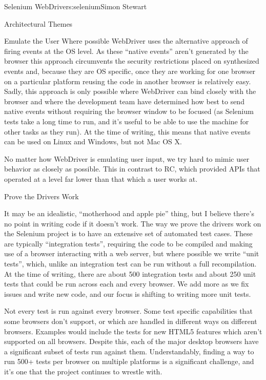 \begin{aosachapter}{Selenium WebDriver}{s:selenium}{Simon Stewart}
\begin{aosasect1}{Architectural Themes}
\begin{aosasect2}{Emulate the User}
Where possible WebDriver uses the alternative approach of firing
events at the OS level. As these ``native events'' aren't generated by
the browser this approach circumvents the security restrictions placed
on synthesized events and, because they are OS specific, once they are
working for one browser on a particular platform reusing the code in
another browser is relatively easy. Sadly, this approach is only
possible where WebDriver can bind closely with the browser
and where the development team have determined how best to send
native events without requiring the browser window to be focused
(as Selenium tests take a long time to run, and it's useful to be
able to use the machine for other tasks as they run). At the time
of writing, this means that native events can be used on Linux and
Windows, but not Mac OS X.

No matter how WebDriver is emulating user input, we try hard to mimic
user behavior as closely as possible. This in contrast to RC, which
provided APIs that operated at a level far lower than that which a
user works at.

\end{aosasect2}

\begin{aosasect2}{Prove the Drivers Work}

It may be an idealistic, ``motherhood and apple pie'' thing, but I
believe there's no point in writing code if it doesn't work. The way
we prove the drivers work on the Selenium project is to have an
extensive set of automated test cases. These are typically
``integration tests'', requiring the code to be compiled and making
use of a browser interacting with a web server, but where possible we
write ``unit tests'', which, unlike an integration test can be run
without a full recompilation. At the time of writing, there are about
500 integration tests and about 250 unit tests that could be run
across each and every browser. We add more as we fix issues and write
new code, and our focus is shifting to writing more unit tests.

Not every test is run against every browser. Some test specific
capabilities that some browsers don't support, or which are handled in
different ways on different browsers. Examples would include the tests
for new HTML5 features which aren't supported on all browsers. Despite
this, each of the major desktop browsers have a significant subset of
tests run against them. Understandably, finding a way to run 500+
tests per browser on multiple platforms is a significant challenge,
and it's one that the project continues to wrestle with.


\end{aosasect2}
\end{aosasect1}
\end{aosachapter}
